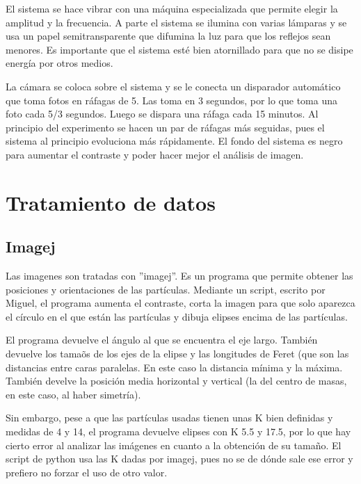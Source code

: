 \documentclass[twoside]{article}
\begin{document}
\begin{multicols}{2}
El sistema se hace vibrar con una m\'aquina especializada que permite elegir la amplitud y la frecuencia. A parte el sistema se ilumina con varias l\'amparas y se usa un papel semitransparente que difumina la luz para que los reflejos sean menores. Es importante que el sistema est\'e bien atornillado para que no se disipe energ\'ia por otros medios.

La c\'amara se coloca sobre el sistema y se le conecta un disparador autom\'atico que toma fotos en r\'afagas de 5. Las toma en 3 segundos, por lo que toma una foto cada 5/3 segundos. Luego se dispara una r\'afaga cada 15 minutos. Al principio del experimento se hacen un par de r\'afagas m\'as seguidas, pues el sistema al principio evoluciona m\'as r\'apidamente. El fondo del sistema es negro para aumentar el contraste y poder hacer mejor el an\'alisis de imagen.


\section*{Tratamiento de datos}

\subsection*{Imagej}

Las imagenes son tratadas con ''imagej''. Es un programa que permite obtener las posiciones y orientaciones de las part\'iculas. Mediante un script, escrito por Miguel, el programa aumenta el contraste, corta la imagen para que solo aparezca el c\'irculo en el que est\'an las part\'iculas y dibuja elipses encima de las part\'iculas. 

El programa devuelve el \'angulo al que se encuentra el eje largo. Tambi\'en devuelve los tama\~os de los ejes de la elipse y las longitudes de Feret (que son las distancias entre caras paralelas. En este caso la distancia m\'inima y la m\'axima. Tambi\'en develve la posici\'on media horizontal y vertical (la del centro de masas, en este caso, al haber simetr\'ia).

Sin embargo, pese a que las part\'iculas usadas tienen unas K bien definidas y medidas de 4 y 14, el programa devuelve elipses con K 5.5 y 17.5, por lo que hay cierto error al analizar las im\'agenes en cuanto a la obtenci\'on de su tama\~no. El script de python usa las K dadas por imagej, pues no se de d\'onde sale ese error y prefiero no forzar el uso de otro valor.


\end{multicols}
\end{document}
